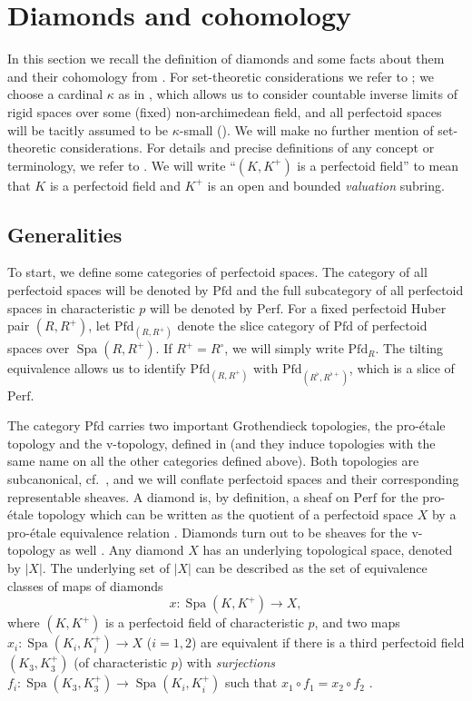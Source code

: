 \documentclass{amsart}
\theoremstyle{remark}
\numberwithin{equation}{subsection}
\DeclareMathOperator{\Spa}{Spa}
\newcommand{\Perf}{\mathrm{Perf}}
\newcommand{\Pfd}{\mathrm{Pfd}}
\renewcommand{\(}{\left(}
\renewcommand{\)}{\right)}
\begin{document}
\section{Diamonds and cohomology}\label{diamonds and cohomology}

In this section we recall the definition of diamonds and some facts about them and their cohomology from \cite{diamonds}. For set-theoretic considerations we refer to \cite[\S 4]{diamonds}; we choose a cardinal $\kappa$ as in \cite[Lemma 4.1]{diamonds}, which allows us to consider countable inverse limits of rigid spaces over some (fixed) non-archimedean field, and all perfectoid spaces will be tacitly assumed to be $\kappa$-small (\cite[Definition 4.3]{diamonds}). We will make no further mention of set-theoretic considerations. For details and precise definitions of any concept or terminology, we refer to \cite{diamonds}. We will write ``$(K,K^{+})$ is a perfectoid field'' to mean that $K$ is a perfectoid field and $K^{+}$ is an open and bounded \emph{valuation} subring.

\subsection{Generalities}

To start, we define some categories of perfectoid spaces. The category of all perfectoid spaces will be denoted by $\Pfd$ and the full subcategory of all perfectoid spaces in characteristic $p$ will be denoted by $\Perf$. For a fixed perfectoid Huber pair $(R,R^{+})$, let $\Pfd_{(R,R^{+})}$ denote the slice category of $\Pfd$ of perfectoid spaces over $\Spa(R,R^{+})$. If $R^{+}=R^{\circ}$, we will simply write $\Pfd_{R}$. The tilting equivalence allows us to identify $\Pfd_{(R,R^{+})}$ with $\Pfd_{(R^{\flat},R^{\flat +})}$, which is a slice of $\Perf$.

The category $\Pfd$ carries two important Grothendieck topologies, the pro-\'etale topology and the v-topology, defined in \cite[Definition 8.1]{diamonds} (and they induce topologies with the same name on all the other categories defined above). Both topologies are subcanonical, cf.~\cite[Corollary 8.6, Theorem 8.7]{diamonds}, and we will conflate perfectoid spaces and their corresponding representable sheaves. A diamond is, by definition, a sheaf on $\Perf$ for the pro-\'etale topology which can be written as the quotient of a perfectoid space $X$ by a pro-\'etale equivalence relation \cite[Definitions 11.1, 11.2]{diamonds}. Diamonds turn out to be sheaves for the v-topology as well \cite[Proposition 11.9]{diamonds}. Any diamond $X$ has an underlying topological space, denoted by $|X|$. The underlying set of $|X|$ can be described as the set of equivalence classes of maps of diamonds
$$ x \colon \Spa(K,K^{+}) \to X, $$
where $(K,K^{+})$ is a perfectoid field of characteristic $p$, and two maps $x_{i} \colon \Spa(K_{i},K_{i}^{+}) \to X$ ($i=1,2$) are equivalent if there is a third perfectoid field $(K_{3},K^{+}_{3})$ (of characteristic $p$) with \emph{surjections} $f_{i} \colon \Spa(K_{3},K^{+}_{3}) \to \Spa(K_{i},K^{+}_{i})$ such that $x_{1}\circ f_{1} = x_{2} \circ f_{2}$ \cite[Proposition 11.13]{diamonds}.
\end{document}
